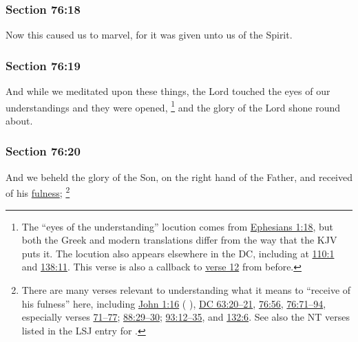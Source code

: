 	\subsubsection{Section 76:18} %
		\label{DC76-18}

		Now this caused us to marvel, for it was given unto us of the Spirit.


	\subsubsection{Section 76:19} %
		\label{DC76-19}

		And while we meditated upon these things, the Lord touched the eyes of our understandings and they were opened,%
		\footnote{%
			\label{DC76-19-eyes}%
			The ``eyes of the understanding'' locution comes from \hyperref[EPHESIANS-1-18]{Ephesians 1:18}, but both the Greek and modern translations differ from the way that the KJV puts it. The locution also appears elsewhere in the DC, including at \hyperref[DC110-1]{110:1} and \hyperref[DC138-11]{138:11}. This verse is also a callback to \hyperref[DC76-12]{verse 12} from before.
			} 
		and the glory of the Lord shone round about.


	\subsubsection{Section 76:20} %
		\label{DC76-20}

		And we beheld the glory of the Son, on the right hand of the Father, and received of his \hyperref[FULNESS]{fulness};%
			\footnote{%
				\label{DC76-20-fulness}%
				There are many verses relevant to understanding what it means to ``receive of his fulness'' here, including \hyperref[JOHN-1-16]{John 1:16} ( \hyperref[PLEROMA]{} ), \hyperref[DC63-20]{DC 63:20--21}, \hyperref[DC76-56]{76:56}, \hyperref[DC76-71]{76:71--94}, especially verses \hyperref[DC76-71]{71--77}; \hyperref[DC88-29]{88:29--30}; \hyperref[DC93-12]{93:12--35}, and \hyperref[DC132-6]{132:6}. See also the NT verses listed in the LSJ entry for \hyperref[PLEROMA]{}.
				}

